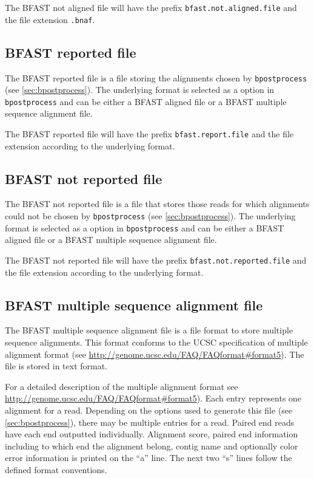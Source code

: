 \documentclass[a4paper,12pt]{book}
\newcommand{\TT}[1]{{\tt #1}} %
\newcommand{\QU}[1]{``#1''} %
\newcommand{\BAF}{BFAST aligned file} %
\newcommand{\BNAF}{BFAST not aligned file} %
\newcommand{\BRF}{BFAST reported file} %
\newcommand{\BNRF}{BFAST not reported file} %
\newcommand{\BMAF}{BFAST multiple sequence alignment file} %
\begin{document}
The \BNAF{} will have the prefix \TT{bfast.not.aligned.file} and the file extension \TT{.bnaf}.

\subsection{\BRF{}}
\label{sec:brf}
The \BRF{} is a file storing the alignments chosen by \TT{bpostprocess} (see \autoref{sec:bpostprocess}).
The underlying format is selected as a option in \TT{bpostprocess} and can be either a \BAF{} or a \BMAF{}.

The \BRF{} will have the prefix \TT{bfast.report.file} and the file extension according to the underlying format.

\subsection{\BNRF{}}
\label{sec:bnrf}
The \BNRF{} is a file that stores those reads for which alignments could not be chosen by \TT{bpostprocess} (see \autoref{sec:bpostprocess}).
The underlying format is selected as a option in \TT{bpostprocess} and can be either a \BAF{} or a \BMAF{}.

The \BNRF{} will have the prefix \TT{bfast.not.reported.file} and the file extension according to the underlying format.

\subsection{\BMAF{}}
\label{sec:bmaf}
The \BMAF{} is a file format to store multiple sequence alignments.
This format conforms to the UCSC specification of  multiple alignment format (see \url{http://genome.ucsc.edu/FAQ/FAQformat#format5}).
The file is stored in text format.

For a detailed description of the multiple alignment format see \url{http://genome.ucsc.edu/FAQ/FAQformat#format5}).
Each entry represents one alignment for a read. 
Depending on the options used to generate this file (see \autoref{sec:bpostprocess}), there may be multiple entries for a read.
Paired end reads have each end outputted individually.
Alignment score, paired end information including to which end the alignment belong, contig name and optionally color error information is printed on the \QU{a} line.
The next two \QU{s} lines follow the defined format conventions.
\end{document}
